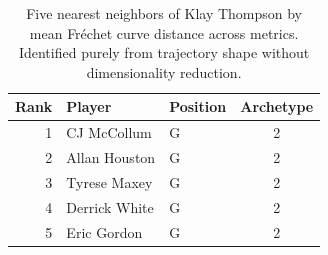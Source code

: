 \begin{table}[htbp]
  \centering\small
  \begin{tabular}{rllc}
    \toprule
    Rank & Player & Position & Archetype \\
    \midrule
    1 & CJ McCollum & G & 2 \\
    2 & Allan Houston & G & 2 \\
    3 & Tyrese Maxey & G & 2 \\
    4 & Derrick White & G & 2 \\
    5 & Eric Gordon & G & 2 \\
    \bottomrule
  \end{tabular}
  \caption{Five nearest neighbors of Klay Thompson by mean Fr\'{e}chet curve distance across metrics. Identified purely from trajectory shape without dimensionality reduction.}
  \label{tab:Klay_Thompson_frechet_curve_neighbors}
\end{table}

